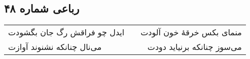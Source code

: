\begin{center}
\section*{رباعی شماره ۴۸}
\label{sec:sh048}
\begin{longtable}{l p{0.5cm} r}
ایدل چو فراقش رگ جان بگشودت
&&
منمای بکس خرقهٔ خون آلودت
\\
می‌نال چنانکه نشنوند آوازت
&&
می‌سوز چنانکه برنیاید دودت
\\
\end{longtable}
\end{center}

